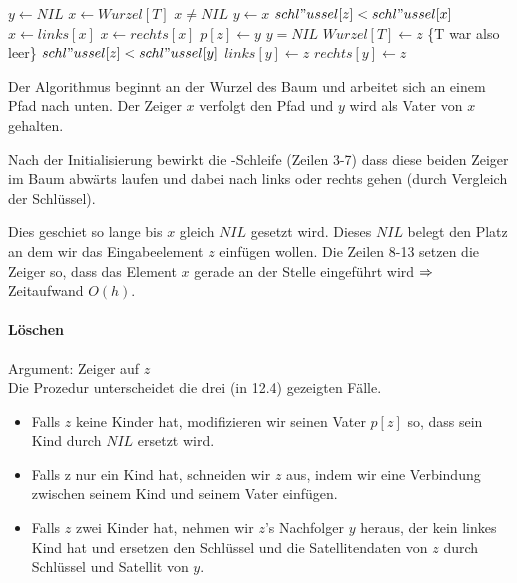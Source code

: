 \documentclass[a4paper,twoside,DIV15,BCOR12mm]{scrbook}
\begin{document}
\begin{codebox}
\li $y \gets NIL$
\li	$x \gets Wurzel[T]$
\li	\While $x \neq NIL$
\li		\Do $y \gets x$
\li			\If $schl"ussel[z] < schl"ussel[x]$
\li				\Then $x \gets links[x]$
\li				\Else $x \gets rechts[x]$
				\End
			\End
\li	$p[z] \gets y$
\li	\If $y = NIL$
\li		\Then $Wurzel[T] \gets z$
\zi			\{T war also leer\}
			\End
\li	\If $schl"ussel[z] < schl"ussel[y]$
\li		\Then $links[y] \gets z$
\li		\Else $rechts[y] \gets z$
\end{codebox}

Der Algorithmus beginnt an der Wurzel des Baum und arbeitet sich an einem Pfad nach unten. Der Zeiger $x$ verfolgt den Pfad und $y$ wird als Vater von $x$ gehalten. 

Nach der Initialisierung bewirkt die \While-Schleife (Zeilen 3-7) dass diese beiden Zeiger im Baum abwärts laufen und dabei nach links oder rechts gehen (durch Vergleich der Schlüssel).

Dies geschiet so lange bis $x$ gleich $NIL$ gesetzt wird. Dieses $NIL$ belegt den Platz an dem wir das Eingabeelement $z$ einfügen wollen. Die Zeilen 8-13 setzen die Zeiger so, dass das Element $x$ gerade an der Stelle eingeführt wird $\Rightarrow$ Zeitaufwand $O(h)$.



\paragraph{Löschen}

Argument: Zeiger auf $z$ \\
Die Prozedur unterscheidet die drei (in 12.4) gezeigten Fälle.
\begin{itemize}
\item Falls $z$ keine Kinder hat, modifizieren wir seinen Vater $p[z]$ so, dass sein Kind durch $NIL$ ersetzt wird.
\item Falls z nur ein Kind hat, schneiden wir $z$ aus, indem wir eine Verbindung zwischen seinem Kind und seinem Vater einfügen.
\item Falls $z$ zwei Kinder hat, nehmen wir $z$'s Nachfolger $y$ heraus, der kein linkes Kind hat und ersetzen den Schlüssel und
die Satellitendaten von $z$ durch Schlüssel und Satellit von $y$.
\end{itemize}
\end{document}
